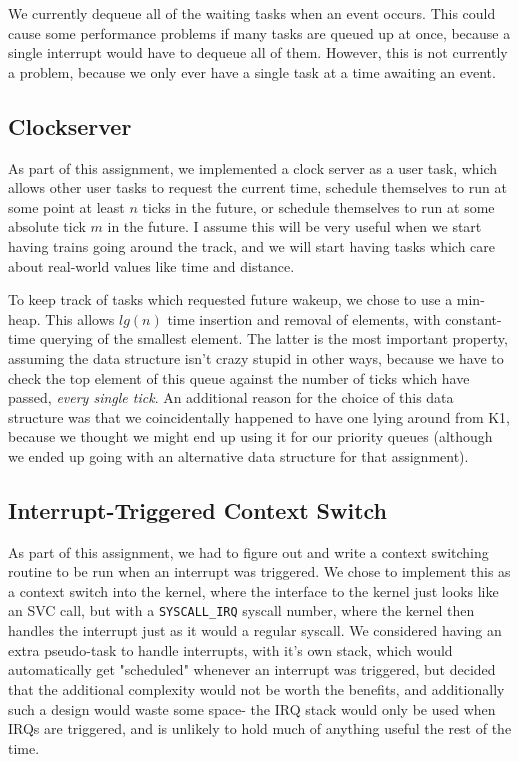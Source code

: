 \documentclass[titlepage]{article}
\begin{document}
We currently dequeue all of the waiting tasks when an event occurs. This could
cause some performance problems if many tasks are queued up at once, because
a single interrupt would have to dequeue all of them. However, this is not
currently a problem, because we only ever have a single task at a time
awaiting an event.

\subsection{Clockserver}
As part of this assignment, we implemented a clock server as a user task, which
allows other user tasks to request the current time, schedule themselves to run
at some point at least $n$ ticks in the future, or schedule themselves to
run at some absolute tick $m$ in the future. I assume this will be very useful
when we start having trains going around the track, and we will start having
tasks which care about real-world values like time and distance.

To keep track of tasks which requested future wakeup, we chose to use a
min-heap. This allows $lg(n)$ time insertion and removal of elements, with
constant-time querying of the smallest element. The latter is the most
important property, assuming the data structure isn't crazy stupid in other
ways, because we have to check the top element of this queue against the
number of ticks which have passed, \emph{every single tick}. An additional
reason for the choice of this data structure was that we coincidentally
happened to have one lying around from K1, because we thought we might end up
using it for our priority queues (although we ended up going with an
alternative data structure for that assignment).

\subsection{Interrupt-Triggered Context Switch}
As part of this assignment, we had to figure out and write a context switching
routine to be run when an interrupt was triggered. We chose to implement this as
a context switch into the kernel, where the interface to the kernel just looks
like an SVC call, but with a \texttt{SYSCALL\_IRQ} syscall number, where the kernel then
handles the interrupt just as it would a regular syscall. We considered having
an extra pseudo-task to handle interrupts, with it's own stack, which would
automatically get "scheduled" whenever an interrupt was triggered, but decided
that the additional complexity would not be worth the benefits, and additionally
such a design would waste some space- the IRQ stack would only be used when
IRQs are triggered, and is unlikely to hold much of anything useful the rest
of the time.
\end{document}
